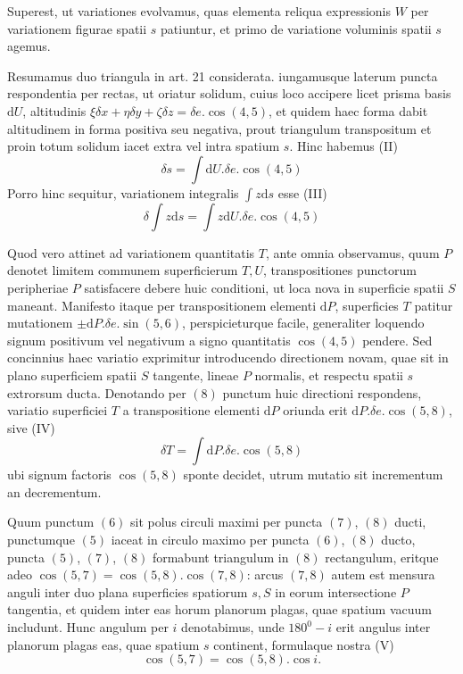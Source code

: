 Superest, ut variationes evolvamus, quas elementa reliqua expressionis $W$ per variationem figurae spatii $s$ patiuntur, et primo de variatione voluminis spatii $s$ agemus.

Resumamus duo triangula in art. 21 considerata. iungamusque laterum puncta respondentia per rectas, ut oriatur solidum, cuius loco accipere licet prisma basis $\mathrm{d}U$, altitudinis $\xi\delta x+\eta\delta y+\zeta\delta z=\delta e.\cos(4,5)$, et quidem haec forma dabit altitudinem in forma positiva seu negativa, prout triangulum transpositum et proin totum solidum iacet extra vel intra spatium $s$. Hinc habemus (II)
\[
\delta s=\int\mathrm{d}U.\delta e.\cos(4,5)
\]
Porro hinc sequitur, variationem integralis $\int z\mathrm{d}s$ esse (III)
\[
\delta\int z\mathrm{d}s=\int z\mathrm{d}U.\delta e.\cos(4,5)
\]

Quod vero attinet ad variationem quantitatis $T$, ante omnia observamus, quum $P$ denotet limitem communem superficierum $T,U$, transpositiones punctorum peripheriae $P$ satisfacere debere huic conditioni, ut loca nova in superficie spatii $S$ maneant. Manifesto itaque per transpositionem elementi $\mathrm{d}P$, superficies $T$ patitur mutationem $\pm\mathrm{d}P.\delta e.\sin(5,6)$, perspicieturque facile, generaliter loquendo signum positivum vel negativum a signo quantitatis $\cos(4,5)$ pendere. Sed concinnius haec variatio exprimitur introducendo directionem novam, quae sit in plano superficiem spatii $S$ tangente, lineae $P$ normalis, et respectu spatii $s$ extrorsum ducta. Denotando per $(8)$ punctum huic directioni respondens, variatio superficiei $T$ a transpositione elementi $\mathrm{d}P$ oriunda erit $\mathrm{d}P.\delta e.\cos(5,8)$, sive (IV)
\[
\delta T=\int\mathrm{d}P.\delta e.\cos(5,8)
\]
ubi signum factoris $\cos(5,8)$ sponte decidet, utrum mutatio sit incrementum an decrementum.

Quum punctum $(6)$ sit polus circuli maximi per puncta $(7)$, $(8)$ ducti, punctumque $(5)$ iaceat in circulo maximo per puncta $(6)$, $(8)$ ducto, puncta $(5)$, $(7)$, $(8)$ formabunt triangulum in $(8)$ rectangulum, eritque adeo $\cos(5,7)=\cos(5,8).\cos(7,8)$: arcus $(7,8)$ autem est mensura anguli inter duo plana superficies spatiorum $s,S$ in eorum intersectione $P$ tangentia, et quidem inter eas horum planorum plagas, quae spatium vacuum includunt. Hunc angulum per $i$ denotabimus, unde $180^0-i$ erit angulus inter planorum plagas eas, quae spatium $s$ continent, formulaque nostra (V)
\[
\cos(5,7)=\cos(5,8).\cos i.
\]

